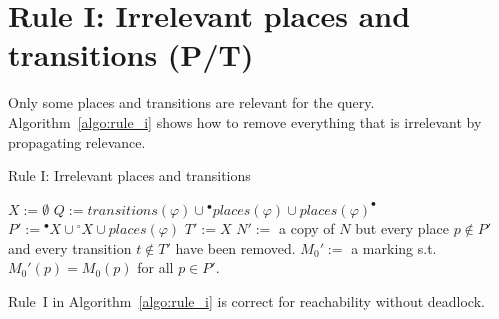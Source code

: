 \section*{Rule I: Irrelevant places and transitions (P/T)}\label{sec:rule_i}
Only some places and transitions are relevant for the query.
Algorithm~\ref{algo:rule_i} shows how to remove everything that is irrelevant by propagating relevance.

\begin{algorithm}
    \vspace{0.2cm}
    \caption{Rule I: Irrelevant places and transitions}
    \label{algo:rule_i}
    \DontPrintSemicolon
    \LinesNumbered
    \vspace{1mm}
    $X:=\emptyset$
    $Q:=transitions(\varphi)\cup{}^\bullet places(\varphi)\cup places(\varphi)^\bullet$
    $P':={}^\bullet X\cup {}^\circ X\cup places(\varphi)$\;
    $T':=X$\;
    $N':=$ a copy of $N$ but every place $p\notin P'$ and every transition $t\notin T'$ have been removed.\;
    $M_0':=$ a marking s.t.\ $M_0'(p)=M_0(p)$ for all $p\in P'$.\;
    \vspace{0.2cm}
\end{algorithm}

\begin{theorem}
    Rule~I in Algorithm~\ref{algo:rule_i} is correct for reachability without deadlock.
\end{theorem}
